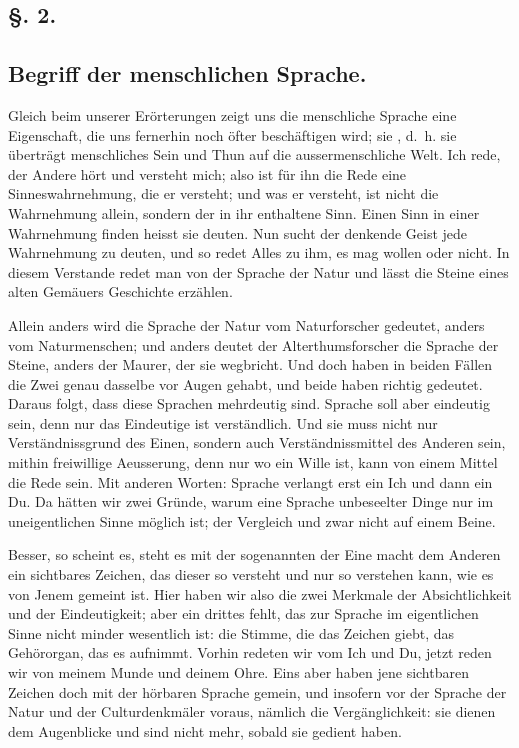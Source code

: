 \label{sp.2}

\subsection*{§. 2.}\label{I.I.2}
\subsection*{Begriff der menschlichen Sprache.}

Gleich beim  unserer Erörterungen zeigt uns die menschliche Sprache eine Eigenschaft, die uns fernerhin noch öfter beschäftigen wird; sie , d.~h. sie überträgt menschliches Sein und Thun auf die aussermenschliche Welt. Ich rede, der Andere hört und versteht mich; also ist für ihn die Rede eine Sinneswahrnehmung, die er versteht; und was er versteht, ist nicht die Wahrnehmung allein, sondern der in ihr enthaltene Sinn. Einen Sinn in einer Wahrnehmung finden heisst sie deuten. Nun sucht der denkende Geist jede Wahrnehmung zu deuten, und so redet Alles zu ihm, es mag wollen oder nicht. In diesem Verstande redet man von der Sprache der Natur und lässt die Steine eines alten Gemäuers Geschichte erzählen.

Allein anders wird die Sprache der Natur vom Naturforscher gedeutet, anders vom Naturmenschen; und anders deutet der Alterthumsforscher die Sprache der Steine, anders der Maurer, der sie wegbricht. Und doch haben in beiden Fällen die Zwei genau dasselbe vor Augen gehabt, und beide haben richtig gedeutet. Daraus folgt, dass diese Sprachen mehrdeutig sind. Sprache soll aber eindeutig sein, denn nur das Eindeutige ist verständlich. Und sie muss nicht nur Verständnissgrund des Einen, sondern auch Verständnissmittel des Anderen sein, mithin freiwillige Aeusserung, denn nur wo ein Wille ist, kann von einem Mittel die Rede sein. Mit anderen Worten: Sprache verlangt erst ein Ich und dann ein Du. Da hätten wir zwei Gründe, warum eine Sprache unbeseelter Dinge nur im uneigentlichen Sinne möglich ist; der Vergleich  und zwar nicht  auf einem Beine.

Besser, so scheint es, steht es mit der sogenannten  der Eine macht dem Anderen ein sichtbares Zeichen, das dieser so versteht und nur so verstehen kann, wie es von Jenem gemeint ist. Hier haben wir also die zwei Merkmale der Absichtlichkeit und der Eindeutigkeit; aber ein drittes fehlt, das zur Sprache im eigentlichen Sinne nicht minder wesentlich ist: die Stimme, die das Zeichen giebt, das Gehörorgan, das es aufnimmt. Vorhin redeten wir vom Ich und \label{fp.2} Du, jetzt reden wir von meinem Munde und deinem Ohre. Eins aber haben jene sichtbaren Zeichen doch mit der hörbaren Sprache gemein, und insofern vor der Sprache der Natur und der Culturdenkmäler voraus, nämlich die Vergänglichkeit: sie dienen dem Augenblicke und sind nicht mehr, sobald sie gedient haben.

